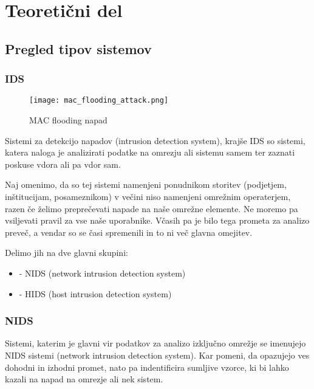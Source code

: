 \documentclass[12pt]{article}
\let\stdsection\section
\renewcommand\section{\newpage\stdsection}
\begin{document}
\section{Teoretični del}

\subsection{Pregled tipov sistemov}
 
\subsubsection{IDS}

\begin{figure}[htb]
\begin{center}
\texttt{[image: mac\_flooding\_attack.png]}
\end{center}
\caption{MAC flooding napad}
\label{mac_flooding}
\end{figure}

Sistemi za detekcijo napadov (intrusion detection system), krajše IDS
so sistemi, katera naloga je analizirati podatke na omrezju ali sistemu samem
ter zaznati poskuse vdora ali pa vdor sam.

Naj omenimo, da so tej sistemi namenjeni ponudnikom storitev (podjetjem, inštitucijam, posameznikom)
v večini niso namenjeni omrežnim operaterjem, razen če želimo preprečevati napade na naše omrežne elemente. 
Ne moremo pa vsiljevati pravil za vse naše uporabnike. Včasih pa je bilo tega prometa za analizo preveč, a vendar
so se časi spremenili in to ni več glavna omejitev.

Delimo jih na dve glavni skupini:

\begin{itemize}
    \item - NIDS (network intrusion detection system)
    \item - HIDS (host intrusion detection system)
\end{itemize}

\subsubsection{NIDS}

Sistemi, katerim je glavni vir podatkov za analizo izključno omrežje se imenujejo NIDS sistemi (network intrusion detection system).
Kar pomeni, da opazujejo ves dohodni in izhodni promet, nato pa indentificira sumljive vzorce, ki bi lahko kazali na napad na omrezje ali nek sistem.
\end{document}
